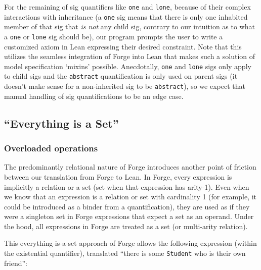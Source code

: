 For the remaining of sig quantifiers like \texttt{one} and \texttt{lone}, because of their complex interactions with inheritance (a \texttt{one} sig means that there is only one inhabited member of that sig that \emph{is not} any child sig, contrary to our intuition as to what a \texttt{one} or \texttt{lone} sig should be), our program prompts the user to write a customized axiom in Lean expressing their desired constraint. Note that this utilizes the seamless integration of Forge into Lean that makes such a solution of model specification `mixins' possible. Anecdotally, \texttt{one} and \texttt{lone} sigs only apply to child sigs and the \texttt{abstract} quantification is only used on parent sigs (it doesn't make sense for a non-inherited sig to be \texttt{abstract}), so we expect that manual handling of sig quantifications to be an edge case. 

\subsection{``Everything is a Set''}\label{sec:everything-is-a-set}
\subsubsection{Overloaded operations}
The predominantly relational nature of Forge introduces another point of friction between our translation from Forge to Lean. In Forge, every expression is implicitly a relation or a set (set when that expression has arity-1). Even when we know that an expression is a relation or set with cardinality 1 (for example, it could be introduced as a binder from a quantification), they are used as if they were a singleton set in Forge expressions that expect a set as an operand. Under the hood, all expressions in Forge are treated as a set (or multi-arity relation). 

This everything-is-a-set approach of Forge allows the following expression (within the existential quantifier), translated ``there is some \texttt{Student} who is their own friend'': 

